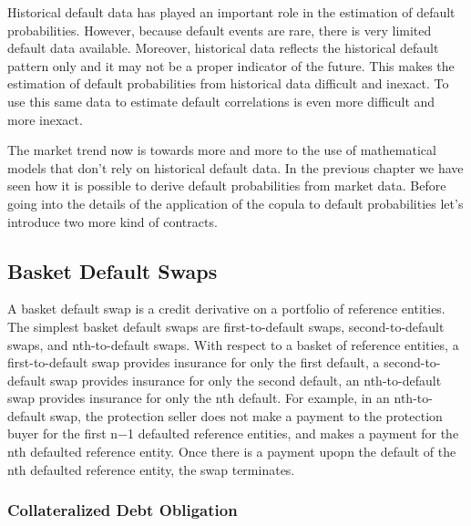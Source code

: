 Historical default data has played an important role in the estimation
of default probabilities. However, because default events are rare,
there is very limited default data available. Moreover, historical data
reflects the historical default pattern only and it may not be a proper
indicator of the future. This makes the estimation of default
probabilities from historical data difficult and inexact. To use this
same data to estimate default correlations is even more difficult and
more inexact.

The market trend now is towards more and more to the use of mathematical
models that don't rely on historical default data. In the previous
chapter we have seen how it is possible to derive default probabilities
from market data. Before going into the details of the application of
the copula to default probabilities let's introduce two more kind of
contracts.

\subsection{Basket Default Swaps}\label{basket-default-swaps}

A basket default swap is a credit derivative on a portfolio of reference
entities. The simplest basket default swaps are first-to-default swaps,
second-to-default swaps, and nth-to-default swaps. With respect to a
basket of reference entities, a first-to-default swap provides insurance
for only the first default, a second-to-default swap provides insurance
for only the second default, an nth-to-default swap provides insurance
for only the nth default. For example, in an nth-to-default swap, the
protection seller does not make a payment to the protection buyer for
the first n−1 defaulted reference entities, and makes a payment for the
nth defaulted reference entity. Once there is a payment upopn the
default of the nth defaulted reference entity, the swap terminates.

\subsubsection{Collateralized Debt Obligation}\label{collateralized-debt-obligation}

